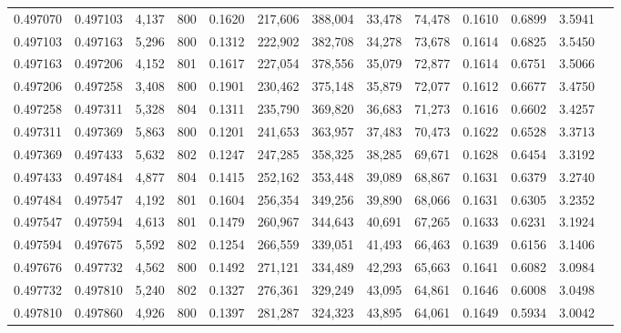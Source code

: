 \begin{tabular}{rrrrrrrrrrrrr}
0.497070 & 0.497103 & 4,137 & 800 &                                     0.1620 & 217,606 & 388,004 &  33,478 &  74,478 & 0.1610 & 0.6899 & 3.5941 \\
0.497103 & 0.497163 & 5,296 & 800 &                                     0.1312 & 222,902 & 382,708 &  34,278 &  73,678 & 0.1614 & 0.6825 & 3.5450 \\
0.497163 & 0.497206 & 4,152 & 801 &                                     0.1617 & 227,054 & 378,556 &  35,079 &  72,877 & 0.1614 & 0.6751 & 3.5066 \\
0.497206 & 0.497258 & 3,408 & 800 &                                     0.1901 & 230,462 & 375,148 &  35,879 &  72,077 & 0.1612 & 0.6677 & 3.4750 \\
0.497258 & 0.497311 & 5,328 & 804 &                                     0.1311 & 235,790 & 369,820 &  36,683 &  71,273 & 0.1616 & 0.6602 & 3.4257 \\
0.497311 & 0.497369 & 5,863 & 800 &                                     0.1201 & 241,653 & 363,957 &  37,483 &  70,473 & 0.1622 & 0.6528 & 3.3713 \\
0.497369 & 0.497433 & 5,632 & 802 &                                     0.1247 & 247,285 & 358,325 &  38,285 &  69,671 & 0.1628 & 0.6454 & 3.3192 \\
0.497433 & 0.497484 & 4,877 & 804 &                                     0.1415 & 252,162 & 353,448 &  39,089 &  68,867 & 0.1631 & 0.6379 & 3.2740 \\
0.497484 & 0.497547 & 4,192 & 801 &                                     0.1604 & 256,354 & 349,256 &  39,890 &  68,066 & 0.1631 & 0.6305 & 3.2352 \\
0.497547 & 0.497594 & 4,613 & 801 &                                     0.1479 & 260,967 & 344,643 &  40,691 &  67,265 & 0.1633 & 0.6231 & 3.1924 \\
0.497594 & 0.497675 & 5,592 & 802 &                                     0.1254 & 266,559 & 339,051 &  41,493 &  66,463 & 0.1639 & 0.6156 & 3.1406 \\
0.497676 & 0.497732 & 4,562 & 800 &                                     0.1492 & 271,121 & 334,489 &  42,293 &  65,663 & 0.1641 & 0.6082 & 3.0984 \\
0.497732 & 0.497810 & 5,240 & 802 &                                     0.1327 & 276,361 & 329,249 &  43,095 &  64,861 & 0.1646 & 0.6008 & 3.0498 \\
0.497810 & 0.497860 & 4,926 & 800 &                                     0.1397 & 281,287 & 324,323 &  43,895 &  64,061 & 0.1649 & 0.5934 & 3.0042 \\

\end{tabular}
